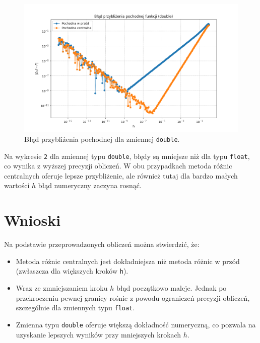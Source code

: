 \documentclass[a4paper, 12pt]{article}
\begin{document}
\begin{figure}[H]
    \centering
    \includegraphics[width=1\textwidth]{wykres_blad_double.png}
    \caption{Błąd przybliżenia pochodnej dla zmiennej \texttt{double}.}
    \label{fig:double_error}
\end{figure}

Na wykresie \texttt{2} dla zmiennej typu \texttt{double}, błędy są mniejsze niż dla typu \texttt{float}, co wynika z wyższej precyzji obliczeń. W obu przypadkach metoda różnic centralnych oferuje lepsze przybliżenie, ale również tutaj dla bardzo małych wartości \( h \) błąd numeryczny zaczyna rosnąć.

\section{Wnioski}
Na podstawie przeprowadzonych obliczeń można stwierdzić, że:
\begin{itemize}
    \item Metoda różnic centralnych jest dokładniejsza niż metoda różnic w przód (zwłaszcza dla większych kroków \texttt{h}).
    \item Wraz ze zmniejszaniem kroku \( h \) błąd początkowo maleje. Jednak po przekroczeniu pewnej granicy rośnie z powodu ograniczeń precyzji obliczeń, szczególnie dla zmiennych typu \texttt{float}.
    \item Zmienna typu \texttt{double} oferuje większą dokładność numeryczną, co pozwala na uzyskanie lepszych wyników przy mniejszych krokach \( h \).
\end{itemize}
\end{document}
